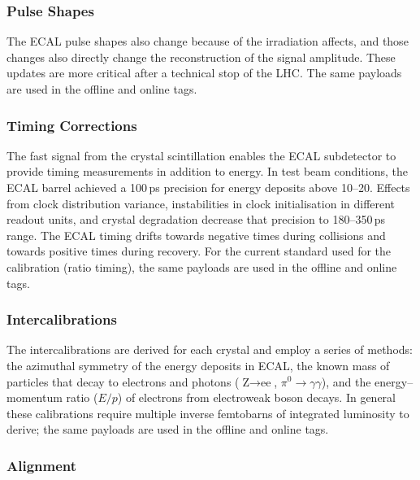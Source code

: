 \subsubsection{Pulse Shapes}


The ECAL pulse shapes also change because of the irradiation affects,
and those changes also directly change the reconstruction of the signal amplitude.
These updates are more critical after a technical stop of the LHC.
The same payloads are used in the offline and online tags.

\subsubsection{Timing Corrections}


The fast signal from the crystal scintillation enables the ECAL subdetector to provide timing measurements in addition to energy.
In test beam conditions, the ECAL barrel achieved a 100\,ps precision for energy deposits above 10--20\GeV.
Effects from clock distribution variance,
instabilities in clock initialisation in different readout units,
and crystal degradation
decrease that precision to 180--350\,ps range.
The ECAL timing drifts
towards negative times during collisions
and
towards positive times during recovery.
For the current standard used for the calibration (ratio timing),
the same payloads are used in the offline and online tags.

\subsubsection{Intercalibrations}


The intercalibrations are derived for each crystal and employ a series of methods:
the azimuthal symmetry of the energy deposits in ECAL,
the known mass of particles that decay to electrons and photons
($\text{Z}\to\text{ee}$, $\pi^0\to\gamma\gamma$),
and
the energy--momentum ratio ($E/p$) of electrons from electroweak boson decays.
In general these calibrations require multiple inverse femtobarns of integrated luminosity to derive;
the same payloads are used in the offline and online tags.

\subsubsection{Alignment}

